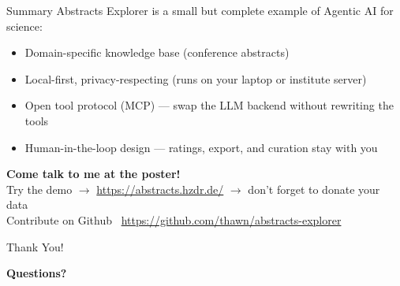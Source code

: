 \documentclass[
  aspectratio=1610,
]{beamer}
\begin{document}
\begin{frame}{Summary}
  \Large
  Abstracts Explorer is a small but complete example of Agentic AI for science:
  \begin{itemize}
    \item Domain-specific knowledge base (conference abstracts)
    \item Local-first, privacy-respecting (runs on your laptop or institute server)
    \item Open tool protocol (MCP) --- swap the LLM backend without rewriting the tools
    \item Human-in-the-loop design --- ratings, export, and curation stay with you
  \end{itemize}
  \vspace{0.3em}
  \textbf{Come talk to me at the poster!}\\
  Try the demo $\rightarrow$ \url{https://abstracts.hzdr.de/} $\rightarrow$ don't forget to donate your data\\
  Contribute on Github \faGithub~\url{https://github.com/thawn/abstracts-explorer}
\end{frame}

\begin{frame}{Thank You!}
  \begin{center}
    \Large
    \textbf{Questions?}
  \end{center}
\end{frame}

\appendix
\end{document}
